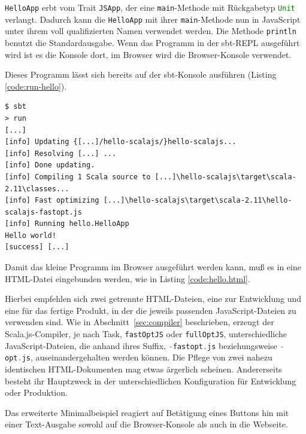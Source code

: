 \documentclass[a4paper, 12pt, hidelinks, listof=totoc, listoftables=totoc, bibliography=totoc]{scrreprt}
\newcommand{\code}[1]{\lstinline[language=Scala, style=inline]|#1|}
\newcommand{\scala}[1]{\lstinline[language=Scala, style=inline]|#1|}
\begin{document}


\scala{HelloApp} erbt vom Trait \scala{JSApp}, der eine \scala{main}-Methode mit Rückgabetyp \scala{Unit} verlangt. Dadurch kann die \scala{HelloApp} mit ihrer \scala{main}-Methode nun in JavaScript unter ihrem voll qualifizierten Namen verwendet werden. Die Methode \scala{println} benutzt die Standardausgabe. Wenn das Programm in der sbt-REPL ausgeführt wird ist es die Konsole dort, im Browser wird die Browser-Konsole verwendet.

Dieses Programm lässt sich bereits auf der sbt-Konsole ausführen (Listing \ref{code:run-hello}).

\begin{lstlisting}[caption={Lauf des Hallo-Welt-Programms in der sbt-REPL.}, label={code:run-hello}]
$ sbt
> run
[...]
[info] Updating {[...]/hello-scalajs/}hello-scalajs...
[info] Resolving [...] ...
[info] Done updating.
[info] Compiling 1 Scala source to [...]\hello-scalajs\target\scala-2.11\classes...
[info] Fast optimizing [...]\hello-scalajs\target\scala-2.11\hello-scalajs-fastopt.js
[info] Running hello.HelloApp
Hello world!
[success] [...]
\end{lstlisting}

Damit das kleine Programm im Browser ausgeführt werden kann, muß es in eine HTML-Datei eingebunden werden, wie in Listing \ref{code:hello.html}.



Hierbei empfehlen sich zwei getrennte HTML-Dateien, eine zur Entwicklung und eine für das fertige Produkt, in der die jeweils passenden JavaScript-Dateien zu verwenden sind. Wie in Abschnitt~\ref{sec:compiler} beschrieben, erzeugt der Scala.js-Compiler, je nach Task, \code{fastOptJS} oder \code{fullOptJS}, unterschiedliche JavaScript-Dateien, die anhand ihres Suffix, \code{-fastopt.js} beziehungsweise \code{-opt.js}, auseinandergehalten werden können. Die Pflege von zwei nahezu identischen HTML-Dokumenten mag etwas ärgerlich scheinen. Andererseits besteht ihr Hauptzweck in der unterschiedlichen Konfiguration für Entwicklung oder Produktion.

Das erweiterte Minimalbeispiel reagiert auf Betätigung eines Buttons hin mit einer Text-Ausgabe sowohl auf die Browser-Konsole als auch in die Webseite.
\end{document}
